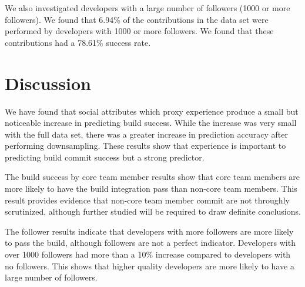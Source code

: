 \documentclass[10pt, conference]{IEEEtran}
\begin{document}
We also investigated developers with a large number of followers (1000 or more
followers).  We found that 6.94\% of the contributions in the data set were
performed by developers with 1000 or more followers.  We found that these
contributions had a 78.61\% success rate.



\section{Discussion}
We have found that social attributes which proxy experience produce a small but
noticeable increase in predicting build success.  While the increase was very
small with the full data set, there was a greater increase in prediction
accuracy after performing downsampling.  These results show that experience is
important to predicting build commit success but a strong predictor.

The build success by core team member results show that core team members are
more likely to have the build integration pass than non-core team members.  This
result provides evidence that non-core team member commit are not throughly
scrutinized, although further studied will be required to draw definite
conclusions.

The follower results indicate that developers with more followers are more
likely to pass the build, although followers are not a perfect indicator.
Developers with over 1000 followers had more than a 10\% increase compared to
developers with no followers.  This shows that higher quality developers are more
likely to have a large number of followers.

%
%
\end{document}
